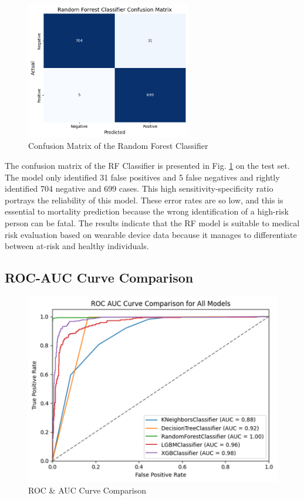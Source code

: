 \documentclass[conference]{IEEEtran}
\begin{document}
\begin{figure}[h]
\centerline{
\includegraphics[height=6cm,width=0.5 \textwidth]{Picture5.png}}
\caption{Confusion Matrix of the Random Forest Classifier}
\label{fig:4}
\end{figure}

The confusion matrix of the RF Classifier is presented in Fig. \ref{fig:4} on the test set. The model only identified 31 false positives and 5 false negatives and rightly identified 704 negative and 699 cases. This high sensitivity-specificity ratio portrays the reliability of this model. These error rates are so low, and this is essential to mortality prediction because the wrong identification of a high-risk person can be fatal. The results indicate that the RF model is suitable to medical risk evaluation based on wearable device data because it manages to differentiate between at-risk and healthy individuals.


\subsection{\textbf{ROC-AUC Curve Comparison}}

\begin{figure}[h]
\centerline{
\includegraphics[width=0.5 \textwidth]{Picture6.png}}
\caption{ROC \& AUC Curve Comparison }
\label{fig:6}
\end{figure}
\end{document}
